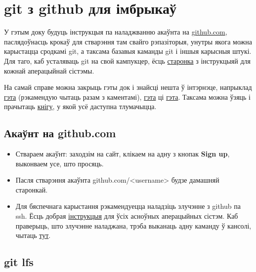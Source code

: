 



\section{git з github для імбрыкаў}

У гэтым доку будуць інструкцыя па наладжванню акаўнта на \href{https://github.com/}{github.com}, паслядоўнасць крокаў для стварэння там свайго рэпазіторыя, унутры якога можна карыстацца сродкамі git, а таксама базавыя каманды git і іншыя карысныя штукі. Для таго, каб усталяваць git на свой кампукцер, ёсць \href{https://git-scm.com/book/en/v2/Getting-Started-Installing-Git}{старонка} з інструкцыяй для кожнай аперацыйнай сістэмы.

На самай справе можна закрыць гэты док і знайсці нешта ў інтэрнэце, напрыклад \href{https://habr.com/ru/post/125799/}{гэта} (рэкамендую чытаць разам з каментамі), \href{https://www.tutorialspoint.com/git/index.htm}{гэта} ці \href{https://githowto.com}{гэта}. Таксама можна ўзяць і прачытаць \href{https://git-scm.com/book/en/v1/}{кнігу}, у якой усё даступна тлумачыцца.

\subsection{Акаўнт на github.com}

\begin{itemize}

\item Ствараем акаўнт: заходзім на сайт, клікаем на адну з кнопак \textbf{Sign up}, выконваем усе, што просяць.

\item Пасля стварэння акаўнта github.com/<username> будзе дамашняй старонкай.

\item Для бяспечнага карыстання рэкамендуецца наладзіць злучэнне з github па ssh. Ёсць добрая \href{https://help.github.com/en/articles/generating-a-new-ssh-key-and-adding-it-to-the-ssh-agent}{інструкцыя} для ўсіх асноўных аперацыйных сістэм. Каб праверыць, што злучэнне наладжана, трэба выканаць адну каманду ў кансолі, чытаць \href{https://help.github.com/en/articles/testing-your-ssh-connection}{тут}.

\end{itemize}

\subsection{git lfs}

